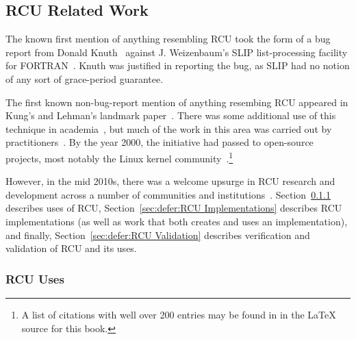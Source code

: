 
\subsection{RCU Related Work}
\label{sec:defer:RCU Related Work}

The known first mention of anything resembling RCU took the form of a bug
report from
Donald Knuth~\cite[page 413 of Fundamental Algorithms]{Knuth73}
against J. Weizenbaum's SLIP list-processing facility for
FORTRAN~\cite{Weizenbaum:1963:SLP:367593.367617}.
Knuth was justified in reporting the bug, as SLIP had no notion of
any sort of grace-period guarantee.

The first known non-bug-report mention of anything resembing RCU appeared
in Kung's and Lehman's landmark paper~\cite{Kung80}.
There was some additional use of this technique in
academia~\cite{Manber82,Manber84,BarbaraLiskov1988ArgusCACM,Pugh90,Andrews91textbook,Pu95a,Cowan96a,Rastogi:1997:LPV:645923.671017,Gamsa99},
but much of the work in this area was carried out by
practitioners~\cite{RichardRashid87a,Hennessy89,Jacobson93,AjuJohn95,Slingwine95,Slingwine97,Slingwine98,McKenney98}.
By the year 2000, the initiative had passed to open-source projects,
most notably the Linux kernel
community~\cite{RustyRussell2000a,RustyRussell2000b,McKenney01b,McKenney01a,McKenney02a,Arcangeli03}.\footnote{
	A list of citations with well over 200 entries may be found in
	 in the {\LaTeX} source for this book.}

However, in the mid 2010s, there was a welcome upsurge in RCU research
and development across a number of communities and
institutions~\cite{FransKaashoek2015ParallelOSHistory}.
Section~\ref{sec:defer:RCU Uses} describes uses of RCU,
Section~\ref{sec:defer:RCU Implementations} describes RCU implementations
(as well as work that both creates and uses an implementation),
and finally,
Section~\ref{sec:defer:RCU Validation} describes verification and validation
of RCU and its uses.

\subsubsection{RCU Uses}
\label{sec:defer:RCU Uses}


